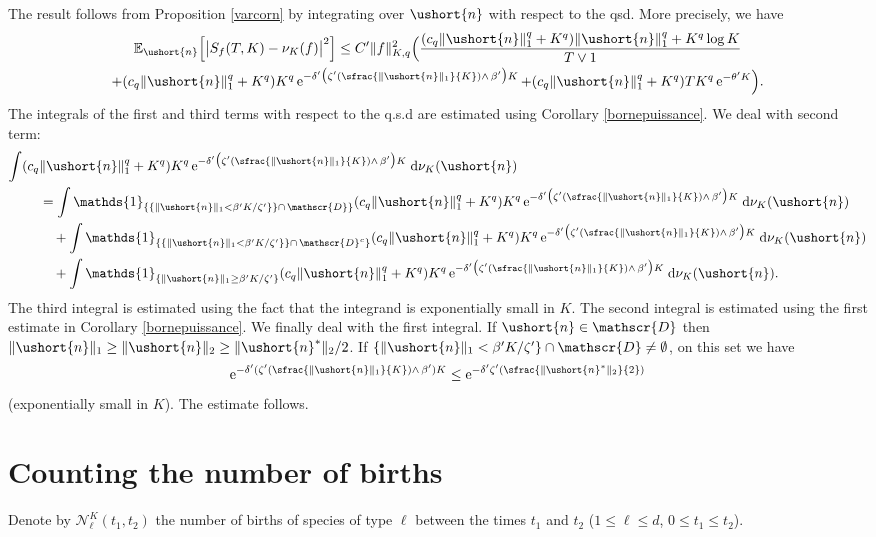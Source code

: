 \documentclass[10pt]{amsart}
\newcommand{\Psfrac}[2]{(\sfrac{#1}{#2})}
\newcommand{\scaleto}[2]{#1}
\let\mathcal\mathscr
\numberwithin{equation}{section}
\theoremstyle{plain}
\theoremstyle{definition}
\newcommand{\E}{{\mathbb{E}}}
\newcommand{\sK}{K}
\newcommand{\un}{\mathds{1}}
\newcommand{\vecn}{\ushort{n}}
\newcommand{\vecnf}{\ushort{n}^*}
\newcommand{\svecnf}{\ushort{n}^*}
\newcommand{\nuk}{\nu_{K}}\let\snuk\nuk
\newcommand{\e}{\operatorname{e}}
\newcommand{\dd}{\hspace{1pt}\mathrm{d}}
\newcommand{\norm}[1]{\|#1\|_{1}}\let\snorm\norm
\newcommand{\normdeux}[1]{\|#1\|_{2}}\let\snormdeux\normdeux
\begin{document}
The result follows from Proposition \ref{varcorn} by integrating over $\vecn$ with respect to the qsd.
More precisely, we have
\begin{multline*}
\E_{\vecn}\Bigl[\big|S_{f}(T,K)-\nuk(f)\big|^2\Bigr]\leq
C'\|f\|_{\sK,q}^2 \Bigl(\frac{(c_q\norm{\vecn}^{q} +K^q) \norm{\vecn}^{q} +K^q \log K}{T\vee 1}\\
+(c_q\norm{\vecn}^{q} +K^q) K^q \e^{-\delta'\bigl(\zeta' \Psfrac{\|\vecn\|_{1}}{K}\wedge\, \beta'\bigr)K}
+ (c_q\norm{\vecn}^{q} +K^q)T K^q \e^{-\theta'K}
\Bigr).
\end{multline*}
The integrals of the first and third terms with respect to the q.s.d are estimated using Corollary \ref{bornepuissance}.
We deal with second term:
\begin{align*}
\int (c_q&\norm{\vecn}^{q} +K^q) K^q \e^{-\delta'\bigl(\zeta' \Psfrac{\|\vecn\|_{1}}{K}\wedge\, \beta'\bigr)K} \dd\nuk(\vecn)\\
&
=\int \un_{\{\{\norm{\vecn} < \beta'K/\zeta'\}\}\cap\, \mathcal{D}\}} (c_q\norm{\vecn}^{q} +K^q) K^q
\e^{-\delta'\bigl(\zeta' \Psfrac{\|\vecn\|_{1}}{K}\wedge\, \beta'\bigr)K} \dd\nuk(\vecn)\\
& \quad+
\int \un_{\{\{\norm{\vecn} < \beta'K/\zeta'\}\}\cap\, \mathcal{D}^c\}} (c_q\norm{\vecn}^{q} +K^q) K^q
\e^{-\delta'\bigl(\zeta' \Psfrac{\|\vecn\|_{1}}{K}\wedge\, \beta'\bigr)K} \dd\nuk(\vecn)\\
& \quad+
\int \un_{\{\norm{\vecn} \geq \beta'K/\zeta'\}} (c_q\norm{\vecn}^{q} +K^q) K^q
\e^{-\delta'\bigl(\zeta' \Psfrac{\|\vecn\|_{1}}{K}\wedge\, \beta'\bigr)K} \dd\nuk(\vecn).
\end{align*}
The third integral is estimated using the fact that the integrand is exponentially small in $K$.
The second integral is estimated using the first estimate in Corollary \ref{bornepuissance}.
We finally deal with the first integral. If $\vecn\in \mathcal{D}$ then
$\norm{\vecn}\geq \normdeux{\vecn}\geq \normdeux{\vecnf}\scaleto{/2}{9pt}$.
If $\{\|\vecn\|_1 < \beta'K/\zeta'\}\cap \mathcal{D} \neq \emptyset$, on this set we have
\[
\e^{-\delta'(\zeta' \Psfrac{\|\vecn\|_{1}}{K}\wedge\, \beta')K}\leq \e^{-\delta'\zeta' \Psfrac{\|\svecnf\|_{\scaleto{2}{3pt}}}{2}}
\]
(exponentially small in $K$). The estimate follows.

\section{Counting the number of births}\label{nbsauts}

Denote by $\mathcal{N}^{\sK}_\ell(t_{1},t_{2})$ the number of births of species of type $\ell$ between the times $t_{1}$ and $t_{2}$ ($1\leq \ell \leq d$, $0\leq t_1\leq t_2$).
\end{document}
